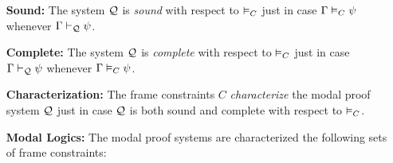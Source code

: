 \documentclass[a4paper, 11pt]{article} %
\begin{document}
\begin{enumerate}
  \item[\bf Sound:] The system $\Q$ is \textit{sound} with respect to $\MLmodels[C]$ just in case $\MetaG \MLmodels[C] \metaB$ whenever $\MetaG \Qproves \metaB$.
  \item[\bf Complete:] The system $\Q$ is \textit{complete} with respect to $\MLmodels[C]$ just in case $\MetaG \Qproves \metaB$ whenever $\MetaG \MLmodels[C] \metaB$.
  \item[\bf Characterization:] The frame constraints $C$ \textit{characterize} the modal proof system $\Q$ just in case $\Q$ is both sound and complete with respect to $\MLmodels[C]$. 
	\item[\bf Modal Logics:] The modal proof systems are characterized the following sets of frame constraints:
    \begin{itemize}
    \end{itemize}
\end{enumerate}
\end{document}
